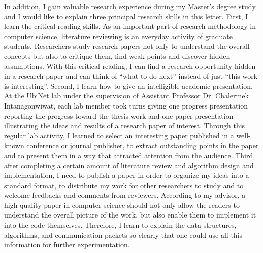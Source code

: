 \documentclass[a4paper,10pt]{report}
\begin{document}
\vspace{0.2cm}
In addition, I gain valuable research experience during my Master's degree study and I would like to explain three principal research skills in this letter. First, I learn the critical reading skills. As an important part of research methodology in computer science, literature reviewing is an everyday activity of graduate students. Researchers study research papers not only to understand the overall concepts but also to critique them, find weak points and discover hidden assumptions. With this critical reading, I can find a research opportunity hidden in a research paper and can think of ``what to do next'' instead of just ``this work is interesting''. Second, I learn how to give an intelligible academic presentation. At the UbiNet lab under the supervision of Assistant Professor Dr. Chalermek Intanagonwiwat, each lab member took turns giving one progress presentation reporting the progress toward the thesis work and one paper presentation illustrating the ideas and results of a research paper of interest. Through this regular lab activity, I learned to select an interesting paper published in a well-known conference or journal publisher, to extract outstanding points in the paper and to present them in a way that attracted attention from the audience. Third, after completing a certain amount of literature review and algorithm design and implementation, I need to publish a paper in order to organize my ideas into a standard format, to distribute my work for other researchers to study and to welcome feedbacks and comments from reviewers. According to my advisor, a high-quality paper in computer science should not only allow the readers to understand the overall picture of the work, but also enable them to implement it into the code themselves. Therefore, I learn to explain the data structures, algorithms, and communication packets so clearly that one could use all this information for further experimentation.
\end{document}

